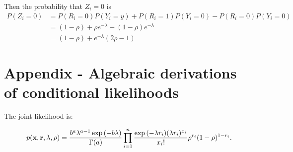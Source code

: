 \documentclass{amsart}
\begin{document}
Then the probability that $Z_i = 0$ is
$$
\begin{array}{ll}
P(Z_i = 0) &= P(R_i = 0)P(Y_i = y) + P(R_i = 1) P(Y_i = 0) - P(R_i = 0) P(Y_i = 0) \\
&= (1 - \rho) + \rho e^{-\lambda} - (1 - \rho) e^{-\lambda} \\
&= (1 - \rho) + e^{-\lambda}(2 \rho - 1)
\end{array}
$$

\section{Appendix - Algebraic derivations of conditional likelihoods}

The joint likelihood is:

$$
p({\bf x}, {\bf r}, \lambda, \rho) = \frac{b^a \lambda^{a - 1} \exp{(-b \lambda)}}{\Gamma{(a)}} \prod_{i=1}^n \frac{\exp{(-\lambda r_i)} (\lambda r_i)^{x_i}}{x_i !} \rho^{r_i} (1 - \rho)^{1 - r_i}.
$$

%
%
%

\end{document}
